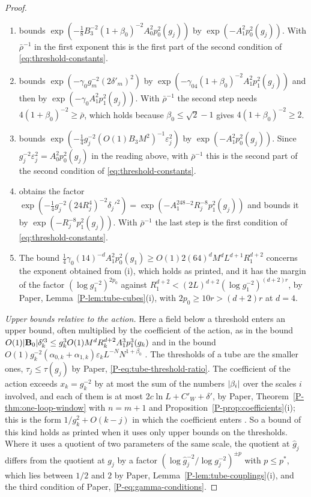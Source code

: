 \documentclass[11pt]{preprint}
\DeclarePairedDelimiter{\abs}{\lvert}{\rvert}
\numberwithin{equation}{section}
\theoremstyle{definition}
\theoremstyle{remark}
\theoremstyle{plain}
\begin{document}
\begin{proof}
\begin{enumerate}[label=(\roman*)]
\item \cite[p.~381]{BalabanLFR2} bounds $\exp(-\frac18B_3^{-2}(1 + \beta_0)^{-2}A_0^2p_0^2(g_j))$ by $\exp(-A_1^2p_0^2(g_j))$. With $\bar\rho^{-1}$ in the first exponent this is the first part of the second condition of \eqref{eq:threshold-constants}.
\item \cite[p.~381]{BalabanLFR2} bounds $\exp(-\gamma_0g_m^{-2}(2\delta'_m)^2)$ by $\exp(-\gamma_04(1 + \beta_0)^{-2}A_1^2p_1^2(g_j))$ and then by $\exp(-\gamma_0A_1^2p_1^2(g_j))$. With $\bar\rho^{-1}$ the second step needs $4(1 + \beta_0)^{-2} \geq \bar\rho$, which holds because $\beta_0 \leq \sqrt2 - 1$ gives $4(1 + \beta_0)^{-2} \geq 2$.
\item \cite[p.~381]{BalabanLFR2} bounds $\exp(-\frac14g_j^{-2}(O(1)B_3M^2)^{-1}\varepsilon_j^2)$ by $\exp(-A_1^2p_0^2(g_j))$. Since $g_j^{-2}\varepsilon_j^2 = A_0^2p_0^2(g_j)$ in the reading above, with $\bar\rho^{-1}$ this is the second part of the second condition of \eqref{eq:threshold-constants}.
\item \cite[p.~382]{BalabanLFR2} obtains the factor $\exp(-\frac14g_j^{-2}(24R_j^4)^{-2}\delta_j'^2) = \exp(-A_1^248^{-2}R_j^{-8}p_1^2(g_j))$ and bounds it by $\exp(-R_j^{-8}p_1^2(g_j))$. With $\bar\rho^{-1}$ the last step is the first condition of \eqref{eq:threshold-constants}.
\item The bound $\frac14\gamma_0(14)^{-d}A_1^2p_0^2(g_1) \geq O(1)2(64)^dM^dL^{d+1}R_1^{d+2}$ \cite[p.~385]{BalabanLFR2} concerns the exponent obtained from (i), which holds as printed, and it has the margin of the factor $(\log g_1^{-2})^{2p_0}$ against $R_1^{d+2} < (2L)^{d+2}(\log g_1^{-2})^{(d+2)r}$, by Paper, Lemma~\ref{P-lem:tube-cubes}(i), with $2p_0 \geq 10r > (d + 2)r$ at $d = 4$.
\end{enumerate}

\emph{Upper bounds relative to the action.} Here a field below a threshold enters an upper bound, often multiplied by the coefficient of the action, as in the bound $O(1)\abs{\mathbf B_0}\delta_k'^3 \leq g_k^3O(1)M^dR_k^{d+2}A_1^3p_1^3(g_k)$ \cite[p.~361]{BalabanLFR2} and in the bound $O(1)g_k^{-2}(\alpha_{0,k} + \alpha_{1,k})\varepsilon_kL^{-N}N^{1+\beta_0}$ \cite[p.~368]{BalabanLFR2}. The thresholds of a tube are the smaller ones, $\tau_j \leq \tau(g_j)$ by Paper, \eqref{P-eq:tube-threshold-ratio}. The coefficient of the action exceeds $x_k = g_k^{-2}$ by at most the sum of the numbers $\abs{\beta_i}$ over the scales $i$ involved, and each of them is at most $2c\ln L + C'_W + \delta'$, by Paper, Theorem~\ref{P-thm:one-loop-window} with $n = m + 1$ and Proposition~\ref{P-prop:coefficients}(i); this is the form $1/g_k^2 + O(k - j)$ in which the coefficient enters \cite[p.~368]{BalabanLFR2}. So a bound of this kind holds as printed when it uses only upper bounds on the thresholds. Where it uses a quotient of two parameters of the same scale, the quotient at $\hat g_j$ differs from the quotient at $g_j$ by a factor $(\log\hat g_j^{-2}/\log g_j^{-2})^{\pm p}$ with $p \leq p^*$, which lies between $1/2$ and $2$ by Paper, Lemma~\ref{P-lem:tube-couplings}(i), and the third condition of Paper, \eqref{P-eq:gamma-conditions}.


\end{proof}
\end{document}
